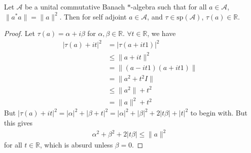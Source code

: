 

\begin{lemma}
  \label{lem:3}
  Let $\mathcal{A}$ be a unital commutative Banach $*$-algebra such
  that for all $a \in \mathcal{A}$, $\|a^*a\| = \|a\|^2$. Then for
  self adjoint $a \in \mathcal{A}$, and  $\tau \in
  \textrm{sp}(\mathcal{A})$, $\tau(a) \in \mathbb{R}$.
\end{lemma}
\begin{proof}
  Let $\tau(a) = \alpha + i \beta$ for $\alpha, \beta \in
  \mathbb{R}$. $\forall t \in \mathbb{R}$, we have
  \begin{align*}
    |\tau(a) + it|^2 &= |\tau(a + it 1)|^2 \\
    &\le \| a + i t\|^2 \\
    &= \|(a - i t 1)(a + it 1)\| \\
    &= \| a^2 + t^2 I \| \\
    &\le \|a^2\| + t^2 \\
    &= \|a\|^2 + t^2
  \end{align*}
  But $|\tau(a) + it|^2 = |\alpha|^2 + |\beta + t|^2 = |\alpha|^2 +
  |\beta|^2 + 2|t \beta| + |t|^2$ to begin with. But this gives
  \begin{align*}
    \alpha^2 + \beta^2 + 2|t \beta| \le \|a\|^2
  \end{align*}
  for all $t \in \mathbb{R}$, which is absurd unless $\beta = 0$.
\end{proof}

